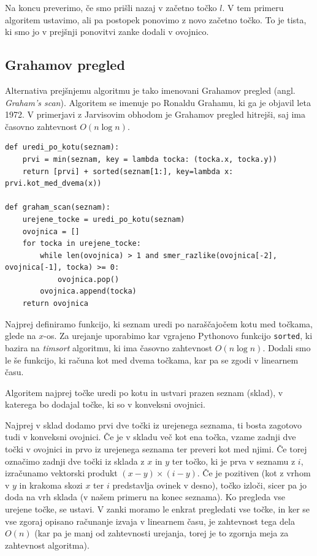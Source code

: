 \documentclass[a4paper]{article}
\begin{document}
Na koncu preverimo, če smo prišli nazaj v začetno točko $l.$ V tem primeru algoritem ustavimo, ali pa postopek ponovimo z novo začetno točko. To je tista, ki smo jo
v prejšnji ponovitvi zanke dodali v ovojnico.

\subsection{Grahamov pregled}
Alternativa prejšnjemu algoritmu je tako imenovani Grahamov pregled (angl. \textit{Graham's scan}). Algoritem se imenuje po Ronaldu Grahamu, ki ga je objavil leta 1972. 
V primerjavi z Jarvisovim obhodom je Grahamov pregled hitrejši, saj ima časovno zahtevnost $O(n \log n)$.

\begin{lstlisting}
def uredi_po_kotu(seznam):
    prvi = min(seznam, key = lambda tocka: (tocka.x, tocka.y))
    return [prvi] + sorted(seznam[1:], key=lambda x: prvi.kot_med_dvema(x))

def graham_scan(seznam):
    urejene_tocke = uredi_po_kotu(seznam)
    ovojnica = []
    for tocka in urejene_tocke:
        while len(ovojnica) > 1 and smer_razlike(ovojnica[-2], ovojnica[-1], tocka) >= 0:           
            ovojnica.pop()
        ovojnica.append(tocka)
    return ovojnica
\end{lstlisting}

Najprej definiramo funkcijo, ki seznam uredi po naraščajočem kotu med točkama, glede na $x$-os. Za urejanje uporabimo kar vgrajeno Pythonovo funkcijo \texttt{sorted},
ki bazira na \textit{timsort} algoritmu, ki ima časovno zahtevnost $O(n \log n).$ Dodali smo le še funkcijo, ki računa kot med dvema točkama, kar pa se zgodi v linearnem času.

Algoritem najprej točke uredi po kotu in ustvari prazen seznam (sklad), 
v katerega bo dodajal točke, ki so v konveksni ovojnici.

Najprej v sklad dodamo prvi dve točki iz urejenega seznama, ti bosta zagotovo tudi v konveksni ovojnici.
Če je v skladu več kot ena točka, vzame zadnji dve točki v ovojnici in prvo iz urejenega seznama ter preveri kot med njimi. Če torej označimo zadnji dve točki iz sklada z $x$ in $y$ ter točko,
ki je prva v seznamu z $i$, izračunamo vektorski produkt $(x-y)\times(i-y)$. 
Če je pozitiven (kot z vrhom v $y$ in krakoma skozi $x$ ter $i$ predstavlja ovinek v desno), točko izloči, 
sicer pa jo doda na vrh sklada (v našem primeru na konec seznama). Ko pregleda vse urejene točke, se ustavi. 
V zanki moramo le enkrat pregledati vse točke, in ker se vse zgoraj opisano računanje izvaja v linearnem času, je zahtevnost tega dela $O(n)$ (kar pa je manj od zahtevnosti urejanja,
torej je to zgornja meja za zahtevnost algoritma).
\end{document}
